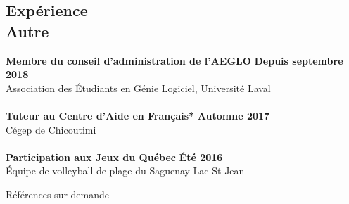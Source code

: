 \documentclass[margin,line]{resume}
\begin{document}
\begin{resume}
    \section{\mysidestyle Exp\'{e}rience\\Autre}
     \textbf{Membre du conseil d'administration de l'AEGLO} \hfill \textbf{Depuis septembre 2018} \vspace{2mm}\\\vspace{1mm}%
    Association des \'{E}tudiants en G\'{e}nie Logiciel, Universit\'{e} Laval \\ \\
   \textbf{Tuteur au Centre d'Aide en Fran\c{c}ais*} \hfill \textbf{Automne 2017} \vspace{2mm}\\\vspace{1mm}%
    C\'{e}gep de Chicoutimi \\ \\
    \textbf{Participation aux Jeux du Qu\'{e}bec} \hfill \textbf{\'{E}t\'{e} 2016} \vspace{2mm}\\\vspace{1mm}%
    \'{E}quipe de volleyball de plage du Saguenay-Lac St-Jean \\



\end{resume}


\name{}
\begin{resume}
\hfill *R\'{e}f\'{e}rences sur demande
\end{resume}
\end{document}

